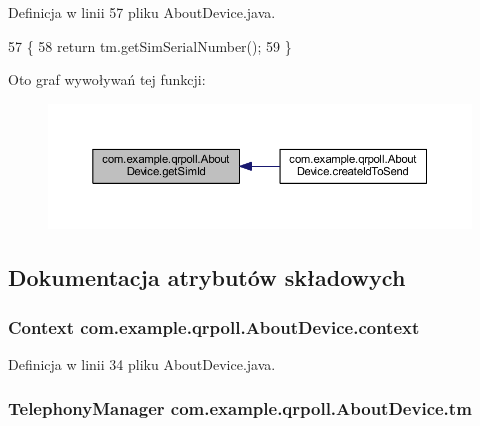 Definicja w linii 57 pliku About\+Device.\+java.


\begin{DoxyCode}
57                             \{
58         \textcolor{keywordflow}{return} tm.getSimSerialNumber();
59     \}
\end{DoxyCode}


Oto graf wywoływań tej funkcji\+:
\nopagebreak
\begin{figure}[H]
\begin{center}
\leavevmode
\includegraphics[width=350pt]{classcom_1_1example_1_1qrpoll_1_1_about_device_a4b4098442ec3ea6028f1a8f9dc0f79b2_icgraph}
\end{center}
\end{figure}




\subsection{Dokumentacja atrybutów składowych}
\hypertarget{classcom_1_1example_1_1qrpoll_1_1_about_device_a11363ff16b18fc93f7a1f019e116b416}{
\subsubsection[{context}]{\setlength{\rightskip}{0pt plus 5cm}Context com.\+example.\+qrpoll.\+About\+Device.\+context\hspace{0.3cm}{\ttfamily [private]}}}\label{classcom_1_1example_1_1qrpoll_1_1_about_device_a11363ff16b18fc93f7a1f019e116b416}


Definicja w linii 34 pliku About\+Device.\+java.

\hypertarget{classcom_1_1example_1_1qrpoll_1_1_about_device_a75cbf05bb659a888a3e6cfec68881775}{
\subsubsection[{tm}]{\setlength{\rightskip}{0pt plus 5cm}Telephony\+Manager com.\+example.\+qrpoll.\+About\+Device.\+tm\hspace{0.3cm}{\ttfamily [private]}}}\label{classcom_1_1example_1_1qrpoll_1_1_about_device_a75cbf05bb659a888a3e6cfec68881775}


